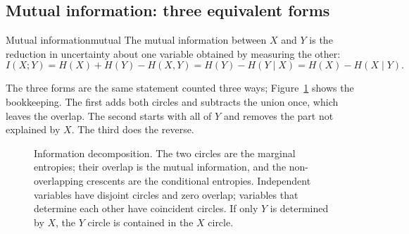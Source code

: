 \subsection{Mutual information: three equivalent forms}\label{subsec:lec02:mi-forms}
\begin{definition}{Mutual information}{mutual}
The mutual information between $X$ and $Y$ is the reduction in uncertainty about one variable obtained by measuring the other:
\begin{equation}\label{eq:lec02:mi}
I(X;Y)=H(X)+H(Y)-H(X,Y)=H(Y)-H(Y\mid X)=H(X)-H(X\mid Y).
\end{equation}
\end{definition}

The three forms are the same statement counted three ways; Figure~\ref{fig:lec02-venn} shows the bookkeeping. The first adds both circles and subtracts the union once, which leaves the overlap. The second starts with all of $Y$ and removes the part not explained by $X$. The third does the reverse.

\begin{figure}[H]
\centering
{}
\caption{Information decomposition. The two circles are the marginal entropies; their overlap is the mutual information, and the non-overlapping crescents are the conditional entropies. Independent variables have disjoint circles and zero overlap; variables that determine each other have coincident circles. If only $Y$ is determined by $X$, the $Y$ circle is contained in the $X$ circle.}\label{fig:lec02-venn}
\end{figure}

